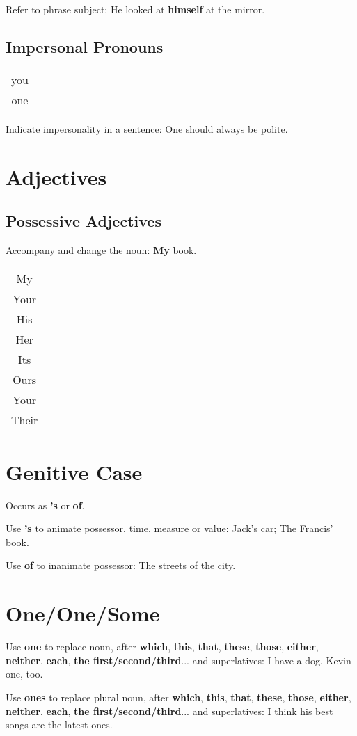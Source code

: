 \documentclass[a4paper, titlepage]{article}
\begin{document}
Refer to phrase subject: He looked at \textbf{himself} at the mirror.
\subsection{Impersonal Pronouns}
 \begin{tabular}{c}
you\\
one
 \end{tabular}
 
 Indicate impersonality in a sentence: One should always be polite.
 
\section{Adjectives}
\subsection{Possessive Adjectives}

Accompany and change the noun: \textbf{My} book.

\begin{tabular}{c}
My\\
Your\\
His\\
Her\\
Its\\
Ours\\
Your\\
Their\\
\end{tabular}
\section{Genitive Case}

Occurs as \textbf{'s} or \textbf{of}.

Use \textbf{'s} to animate possessor, time, measure or value: Jack's car; The Francis' book.


Use \textbf{of} to inanimate possessor: The streets of the city.
\section{One/One/Some}

Use \textbf{one} to replace noun, after \textbf{which}, \textbf{this}, \textbf{that}, \textbf{these}, \textbf{those}, \textbf{either}, \textbf{neither}, \textbf{each}, \textbf{the first/second/third}... and superlatives: I have a dog. Kevin one, too.


Use \textbf{ones} to replace plural noun, after \textbf{which}, \textbf{this}, \textbf{that}, \textbf{these}, \textbf{those}, \textbf{either}, \textbf{neither}, \textbf{each}, \textbf{the first/second/third}... and superlatives: I think his best songs are the latest ones.
\end{document}

